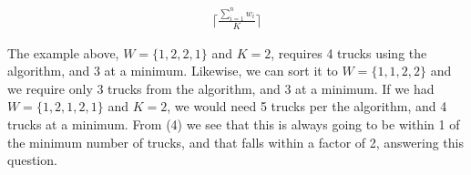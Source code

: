 \documentclass{article}
\begin{document}
\begin{gather}
    \lceil \frac{\sum_{i=1}^{n} w_i}{K} \rceil
\end{gather}

The example above, $W = \{1, 2, 2, 1\}$ and $K = 2$, requires 4 trucks using the algorithm, and 3 at a minimum. Likewise, we can sort it to $W = \{1, 1, 2, 2\}$ and we require only 3 trucks from the algorithm, and 3 at a minimum. If we had $W = \{1, 2, 1, 2, 1\}$ and $K = 2$, we would need 5 trucks per the algorithm, and 4 trucks at a minimum. From (4) we see that this is always going to be within 1 of the minimum number of trucks, and that falls within a factor of 2, answering this question.

\newpage
 

\end{document}
